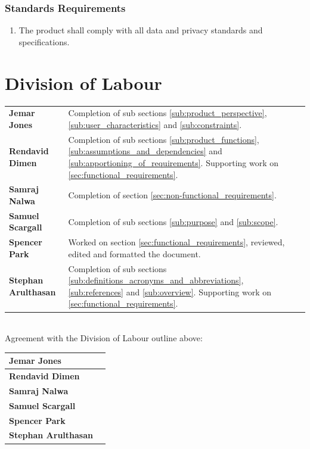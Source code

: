 \documentclass[]{article}
\newcounter{saveenum}
\newcommand{\pauseEnum}{\setcounter{saveenum}{\value{enumi}}}
\newcommand{\resumeEnum}{\setcounter{enumi}{\value{saveenum}}}
\begin{document}
\subsubsection{Standards Requirements}
\label{ssub:standards_requirements}
\begin{enumerate}[{LR}1. ]
	\resumeEnum
	\item The product shall comply with all data and privacy standards and specifications.
	\pauseEnum
\end{enumerate}



\appendix

\newpage
\section{Division of Labour}
\label{sec:division_of_labour}
\noindent\begin{tabular}{l l}
	\textbf{Jemar Jones} & Completion of sub sections \ref{sub:product_perspective}, \ref{sub:user_characteristics} and \ref{sub:constraints}. \\
	\textbf{Rendavid Dimen} & Completion of sub sections \ref{sub:product_functions}, \ref{sub:assumptions_and_dependencies} and \ref{sub:apportioning_of_requirements}. Supporting work on \ref{sec:functional_requirements}.\\
	\textbf{Samraj Nalwa} & Completion of section \ref{sec:non-functional_requirements}. \\
	\textbf{Samuel Scargall} & Completion of sub sections \ref{sub:purpose} and \ref{sub:scope}. \\
	\textbf{Spencer Park} & Worked on section \ref{sec:functional_requirements}, reviewed, edited and formatted the document.\\
	\textbf{Stephan Arulthasan} & Completion of sub sections \ref{sub:definitions_acronyms_and_abbreviations}, \ref{sub:references} and \ref{sub:overview}. Supporting work on \ref{sec:functional_requirements}.\\
\end{tabular}
\\

\noindent Agreement with the Division of Labour outline above:

\noindent\begin{tabularx}{\linewidth}{|l|X|}
	\hline
	\rule{0pt}{2em} \textbf{Jemar Jones} & \\
	\hline
	\rule{0pt}{2em} \textbf{Rendavid Dimen} & \\
	\hline
	\rule{0pt}{2em} \textbf{Samraj Nalwa} & \\
	\hline
	\rule{0pt}{2em} \textbf{Samuel Scargall} & \\
	\hline
	\rule{0pt}{2em} \textbf{Spencer Park} & \\
	\hline
	\rule{0pt}{2em} \textbf{Stephan Arulthasan} & \\
	\hline
\end{tabularx}
\end{document}
